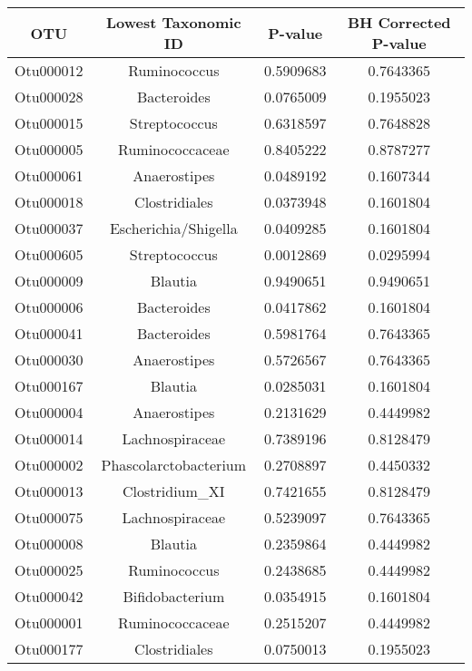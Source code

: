 \documentclass[12pt,]{article}
\begin{document}
\begin{longtable}[]{@{}cccc@{}}
\toprule
OTU & Lowest Taxonomic ID & P-value & BH Corrected
P-value\tabularnewline
\midrule
\endhead
Otu000012 & Ruminococcus & 0.5909683 & 0.7643365\tabularnewline
Otu000028 & Bacteroides & 0.0765009 & 0.1955023\tabularnewline
Otu000015 & Streptococcus & 0.6318597 & 0.7648828\tabularnewline
Otu000005 & Ruminococcaceae & 0.8405222 & 0.8787277\tabularnewline
Otu000061 & Anaerostipes & 0.0489192 & 0.1607344\tabularnewline
Otu000018 & Clostridiales & 0.0373948 & 0.1601804\tabularnewline
Otu000037 & Escherichia/Shigella & 0.0409285 & 0.1601804\tabularnewline
Otu000605 & Streptococcus & 0.0012869 & 0.0295994\tabularnewline
Otu000009 & Blautia & 0.9490651 & 0.9490651\tabularnewline
Otu000006 & Bacteroides & 0.0417862 & 0.1601804\tabularnewline
Otu000041 & Bacteroides & 0.5981764 & 0.7643365\tabularnewline
Otu000030 & Anaerostipes & 0.5726567 & 0.7643365\tabularnewline
Otu000167 & Blautia & 0.0285031 & 0.1601804\tabularnewline
Otu000004 & Anaerostipes & 0.2131629 & 0.4449982\tabularnewline
Otu000014 & Lachnospiraceae & 0.7389196 & 0.8128479\tabularnewline
Otu000002 & Phascolarctobacterium & 0.2708897 & 0.4450332\tabularnewline
Otu000013 & Clostridium\_XI & 0.7421655 & 0.8128479\tabularnewline
Otu000075 & Lachnospiraceae & 0.5239097 & 0.7643365\tabularnewline
Otu000008 & Blautia & 0.2359864 & 0.4449982\tabularnewline
Otu000025 & Ruminococcus & 0.2438685 & 0.4449982\tabularnewline
Otu000042 & Bifidobacterium & 0.0354915 & 0.1601804\tabularnewline
Otu000001 & Ruminococcaceae & 0.2515207 & 0.4449982\tabularnewline
Otu000177 & Clostridiales & 0.0750013 & 0.1955023\tabularnewline
\bottomrule
\end{longtable}

\newpage
\end{document}
